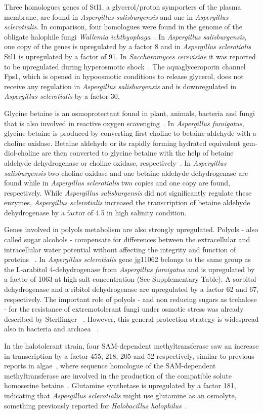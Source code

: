 \documentclass[jof,article,submit,moreauthors,pdftex,10pt,a4paper]{Definitions/mdpi}
\newcommand{\aspFum}{\textit{Aspergillus fumigatus}}
\newcommand{\walIch}{\textit{Wallemia ichthyophaga}}
\newcommand{\sacCer}{\textit{Saccharomyces cerevisiae}}
\newcommand{\phiSp}{\textit{Aspergillus salisburgensis}}
\newcommand{\phiScl}{\textit{Aspergillus sclerotialis}}
\begin{document}
Three homologues genes of  Stl1, a glycerol/proton symporters of the plasma membrane,  are found in \phiSp{} and one in \phiScl{}. In comparison, four homologues were found in the genome of the obligate halophile fungi \walIch{}~\cite{Plemenitas2014}. In \phiSp{}, one copy of the genes is upregulated by a factor 8 and in \phiScl{} Stl1 is upregulated by a factor of 91. In \sacCer{} it was reported to be upregulated during hyperosmotic shock~\cite{Ferreira2005}. The aquaglyceroporin channel Fps1, which is opened in hypoosmotic conditions to release glycerol\cite{Luyten1995}, does not receive any regulation in \phiSp{} and is downregulated in \phiScl{} by a factor 30.

Glycine betaine is an osmoprotectant found in plant, animals, bacteria and fungi that is also involved in reactive oxygen scavenging~\cite{Lambou2013}. In \aspFum{}, glycine betaine is produced by converting first choline to betaine aldehyde with a choline oxidase. Betaine aldehyde or its rapidly forming hydrated equivalent gem-diol-choline are then converted to glycine betaine with the help of betaine aldehyde dehydrogenase or choline oxidase, respectively~\cite{Lambou2013}. In \phiSp{} two choline oxidase and one betaine aldehyde dehydrogenase are found while in \phiScl{} two copies and one copy are found, respectively. While \phiSp{} did not significantly regulate these enzymes, \phiScl{} increased the transcription of betaine aldehyde dehydrogenase by a factor of 4.5 in high salinity condition.

Genes involved in polyols metabolism  are also strongly upregulated. Polyols - also called sugar alcohols - compensate  for differences between the extracellular and intracellular water potential without affecting the integrity and function of proteins ~\cite{Brown1990}. In \phiScl{} gene jg11062 belongs to the same group as the L-arabitol 4-dehydrogenase from \aspFum{} and is upregulated by a factor of 1063 at high salt concentration (See Supplementary Table). A sorbitol dehydrogenase and a ribitol dehydrogenase are upregulated by a factor 62 and 67, respectively. The important role of polyols - and non reducing sugars as trehalose - for the resistance of extremotolerant fungi under osmotic stress was already described by Sterflinger ~\cite{Sterflinger1998}. However, this general protection strategy is widespread also in bacteria and archaea ~\cite{Gunde-Cimerman2018}.   

In the halotolerant strain, four SAM-dependent methyltransferase saw an increase in transcription by a factor 455, 218, 205 and 52 respectively,  similar to previous reports in algae~\cite{Krell2006}, where sequence homologue of the SAM-dependent methyltransferase are involved in the production of the compatible solute homoserine betaine~\cite{Pade2016}. Glutamine synthetase is upregulated by a factor 181, indicating that \phiScl{} might use glutamine as an osmolyte, something previously reported for \textit{Halobacillus halophilus}~\cite{Saum2006}. 
\end{document}
